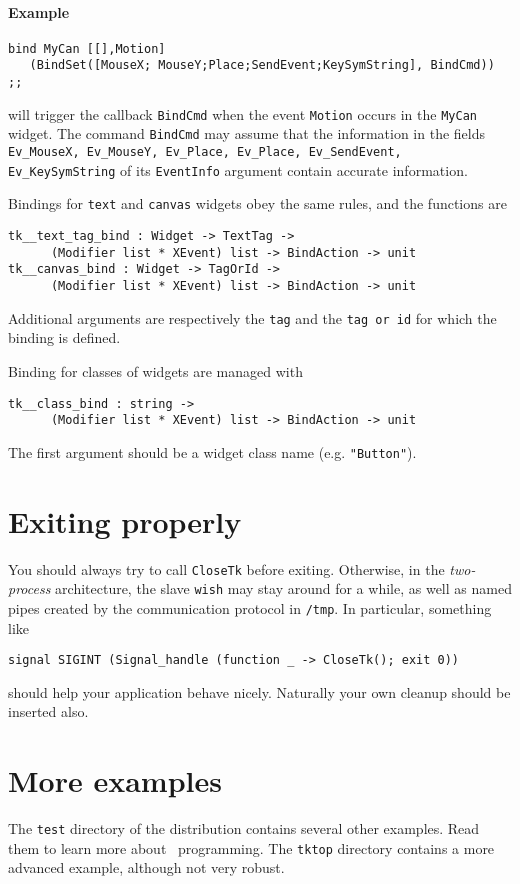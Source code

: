 \paragraph{Example}
\begin{verbatim}
bind MyCan [[],Motion] 
   (BindSet([MouseX; MouseY;Place;SendEvent;KeySymString], BindCmd)) ;;
\end{verbatim} 
will trigger the callback \verb|BindCmd| when the event \verb|Motion| occurs
in the \verb|MyCan| widget. The command \verb|BindCmd| may assume that the 
information in the fields {\tt Ev\_MouseX, Ev\_MouseY, Ev\_Place, Ev\_Place,
Ev\_SendEvent, Ev\_KeySymString} of its \verb|EventInfo| argument contain
accurate information.

Bindings for \verb|text| and \verb|canvas| widgets obey the same rules,
and the functions are 
\begin{verbatim}
tk__text_tag_bind : Widget -> TextTag -> 
      (Modifier list * XEvent) list -> BindAction -> unit
tk__canvas_bind : Widget -> TagOrId -> 
      (Modifier list * XEvent) list -> BindAction -> unit
\end{verbatim} 
Additional arguments are respectively the {\tt tag} and the {\tt tag or id}
for which the binding is defined.

Binding for classes of widgets are managed with
\begin{verbatim}
tk__class_bind : string -> 
      (Modifier list * XEvent) list -> BindAction -> unit
\end{verbatim} 
The first argument should be a widget class name (e.g. \verb|"Button"|).

\section{Exiting properly}
You should always try to call \verb|CloseTk| before exiting. Otherwise, in
the {\em two-process} architecture, the slave {\tt wish} may stay around for
a while, as well as named pipes created by the communication protocol in
\verb|/tmp|. In particular, something like  
\begin{verbatim}
signal SIGINT (Signal_handle (function _ -> CloseTk(); exit 0))
\end{verbatim} 
should help your application behave nicely. Naturally your own cleanup
should be inserted also.

\section{More examples}
The \verb|test| directory of the distribution contains several other
examples. Read them to learn more about \caml\tk\ programming.
The \verb|tktop| directory contains a more advanced example, although
not very robust.


